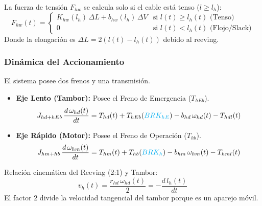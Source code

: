 \documentclass[11pt]{article}                                    %
\begin{document}
La fuerza de tensión $F_{hw}$ se calcula solo si el cable está tenso ($l \ge l_h$):
\begin{equation} \label{eq:tension_izaje}
    F_{hw}(t) = 
    \begin{cases} 
        K_{hw}(l_h) \, \Delta L + b_{hw}(l_h) \, \Delta V & \text{si } l(t) \ge l_h(t) \text{ (Tenso)} \\
        0 & \text{si } l(t) < l_h(t) \text{ (Flojo/Slack)}
    \end{cases}
\end{equation}
Donde la elongación es $\Delta L = 2(l(t) - l_h(t))$ debido al reeving.

\subsubsection{Dinámica del Accionamiento}
El sistema posee dos frenos y una transmisión.
\begin{itemize}
    \item \textbf{Eje Lento (Tambor):} Posee el Freno de Emergencia ($T_{hEb}$).
    \begin{equation}
        J_{hd+hEb} \, \frac{d \, \omega_{hd}(t)}{dt} = T_{hd}(t) + T_{hEb}(\textcolor{cyan}{BRK_{hE}}) - b_{hd} \, \omega_{hd}(t) - T_{hdl}(t)
    \end{equation}
    \item \textbf{Eje Rápido (Motor):} Posee el Freno de Operación ($T_{hb}$).
    \begin{equation}
        J_{hm+hb} \, \frac{d \, \omega_{hm}(t)}{dt} = T_{hm}(t) + T_{hb}(\textcolor{cyan}{BRK_{h}}) - b_{hm} \, \omega_{hm}(t) - T_{hml}(t)
    \end{equation}
\end{itemize}

Relación cinemática del Reeving (2:1) y Tambor:
\begin{equation}
    v_h(t) = \frac{r_{hd} \, \omega_{hd}(t)}{2} = -\frac{d \, l_h(t)}{dt}
\end{equation}
El factor 2 divide la velocidad tangencial del tambor porque es un aparejo móvil.
\end{document}
